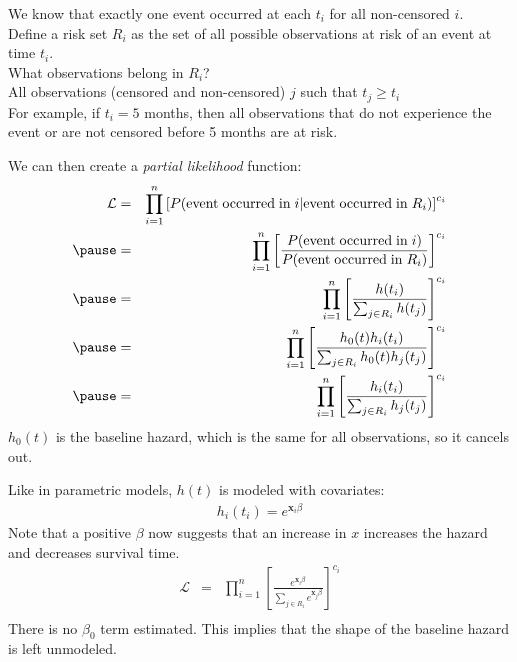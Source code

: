 \documentclass[handout]{beamer}
\begin{document}
\begin{frame}
We know that exactly one event occurred at each $t_i$ for all
non-censored $i$. \\
\pause
\bigskip
Define a risk set $R_i$ as the set of all possible observations at
risk of an event at time $t_i$.\\
\pause
\bigskip
What observations belong in $R_i$?\\
\pause
\bigskip
All observations (censored and non-censored) $j$ such
that $t_j \ge t_i$\\
\pause
\bigskip
For example, if $t_i = 5$ months, then all observations that do not
experience the event or are not censored before 5 months are at risk.

\end{frame}

\begin{frame}
We can then create a \emph{partial likelihood} function:
\pause
\begin{eqnarray*}
\mathcal{L} &=& \prod_{i=1}^n \left[ P(\mathrm{event \; occurred \; in} \; i |
\mathrm{event \; occurred \; in} \; R_i) \right] ^{c_i}  \\
\pause
&=& \prod_{i=1}^n \left[ \frac{P(\mathrm{event \; occurred \; in} \;
i)}{P(\mathrm{event \; occurred \; in} \; R_i)} \right] ^{c_i} \\
\pause
&=& \prod_{i=1}^n \left[ \frac{h(t_i)}{\sum_{j \in R_i} h(t_j)}
\right] ^{c_i}\\
\pause
&=& \prod_{i=1}^n \left[ \frac{h_0(t)h_i(t_i)}{\sum_{j \in R_i} h_0(t)h_j(t_j)}
\right] ^{c_i}\\
\pause
&=& \prod_{i=1}^n \left[ \frac{h_i(t_i)}{\sum_{j \in R_i} h_j(t_j)}
\right] ^{c_i}\\
\end{eqnarray*}
\pause
$h_0(t)$ is the baseline hazard, which is the same for all
observations, so it cancels out.

\end{frame}

\begin{frame}
Like in parametric models, $h(t)$ is modeled with covariates:
\pause
\begin{eqnarray*}
h_i(t_i) = e^{\mathbf{x}_i \beta}
\end{eqnarray*}
\pause
Note that a positive $\beta$ now suggests that an increase in $x$
increases the hazard and decreases survival time.
\pause
\begin{eqnarray*}
\mathcal{L} &=& \prod_{i=1}^n \left[ \frac{e^{\mathbf{x}_i
\beta}}{\sum_{j \in R_i} e^{\mathbf{x}_j \beta}}
\right] ^{c_i} \\
\end{eqnarray*}
\pause
There is no $\beta_0$ term estimated.  
\pause
This implies that the shape of the baseline hazard is left unmodeled.
\end{frame}
\end{document}
